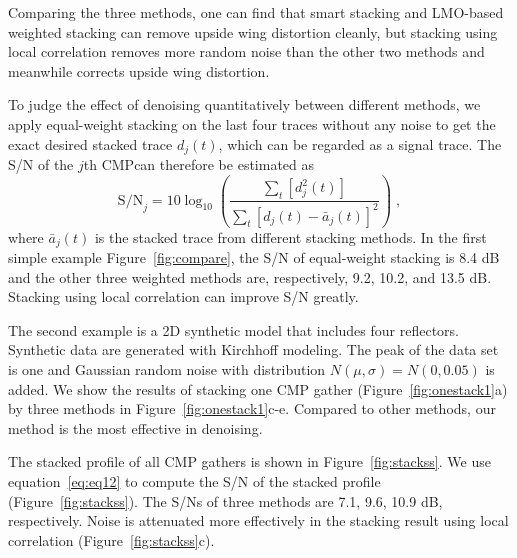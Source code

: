 Comparing the three methods, one can find that smart stacking
and LMO-based weighted stacking can remove upside wing distortion
cleanly, but stacking using local correlation removes more random
noise than the other two methods and meanwhile corrects upside
wing distortion.

To judge the effect of denoising quantitatively between different
methods, we apply equal-weight stacking on the last four traces
without any noise to get the exact desired stacked trace $d_j(t)$, which
can be regarded as a signal trace. The S/N of the $j$th CMPcan therefore
be estimated as
      \begin{equation}
          \textrm{S/N}_j = 10 \log_{10} \left(\frac{\displaystyle\sum_t[d^2_j(t)]}{\displaystyle\sum_t[d_j(t)-\bar{a}_j(t)]^2} \right) \;,
        \label{eq:eq12}
      \end{equation}
where $\bar{a}_j(t)$ is the stacked trace from different
stacking methods. In the first simple example
Figure~\ref{fig:compare}, the S/N of equal-weight stacking is
8.4 dB and the other three weighted methods are,
respectively, 9.2, 10.2, and 13.5 dB. Stacking using
local correlation can improve S/N greatly.

The second example is a 2D synthetic model
that includes four reflectors. Synthetic data are
generated with Kirchhoff modeling. The peak of
the data set is one and Gaussian random noise
with distribution $N(\mu,\sigma)=N(0,0.05)$ is added.
We show the results of stacking one CMP gather
(Figure~\ref{fig:onestack1}a) by three methods in 
Figure~\ref{fig:onestack1}c-e.
Compared to other methods, our method is the
most effective in denoising.

The stacked profile of all CMP gathers is
shown in Figure~\ref{fig:stackss}. We use equation~\ref{eq:eq12} to compute
the S/N of the stacked profile (Figure~\ref{fig:stackss}). The
S/Ns of three methods are 7.1, 9.6, 10.9 dB, respectively.
Noise is attenuated more effectively in
the stacking result using local correlation (Figure~\ref{fig:stackss}c).

